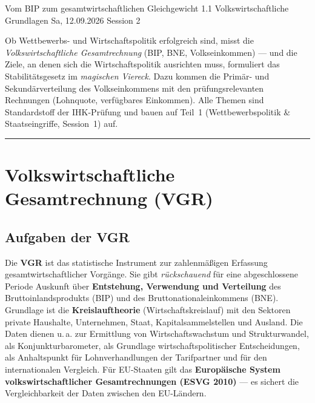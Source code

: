 \documentclass[11pt, a4paper]{article}
\begin{document}
%
  {Vom BIP zum gesamtwirtschaftlichen Gleichgewicht}%
  {1.1 Volkswirtschaftliche Grundlagen}%
  {Sa, 12.09.2026 \textperiodcentered{} Session 2}

\begin{merksatz}[title={\bfseries Worum geht es in Teil 2?}]
Ob Wettbewerbs- und Wirtschaftspolitik erfolgreich sind, misst die
\emph{Volkswirtschaftliche Gesamtrechnung} (BIP, BNE, Volkseinkommen) --- und die Ziele,
an denen sich die Wirtschaftspolitik ausrichten muss, formuliert das Stabilitätsgesetz
im \emph{magischen Viereck}. Dazu kommen die Primär- und Sekundärverteilung des
Volkseinkommens mit den prüfungsrelevanten Rechnungen (Lohnquote, verfügbares
Einkommen). Alle Themen sind Standardstoff der IHK-Prüfung und bauen auf Teil~1
(Wettbewerbspolitik \& Staatseingriffe, Session~1) auf.
\end{merksatz}

\tableofcontents
\vspace{1em}
\hrule
\vspace{1em}

\section{Volkswirtschaftliche Gesamtrechnung (VGR)}

\subsection{Aufgaben der VGR}

Die \textbf{VGR} ist das statistische Instrument zur zahlenmäßigen Erfassung
gesamtwirtschaftlicher Vorgänge. Sie gibt \emph{rückschauend} für eine abgeschlossene
Periode Auskunft über \textbf{Entstehung, Verwendung und Verteilung} des
Bruttoinlandsprodukts (BIP) und des Bruttonationaleinkommens (BNE). Grundlage ist die
\textbf{Kreislauftheorie} (Wirtschaftskreislauf) mit den Sektoren private Haushalte,
Unternehmen, Staat, Kapitalsammelstellen und Ausland. Die Daten dienen u.\,a. zur
Ermittlung von Wirtschaftswachstum und Strukturwandel, als Konjunkturbarometer, als
Grundlage wirtschaftspolitischer Entscheidungen, als Anhaltspunkt für Lohnverhandlungen
der Tarifpartner und für den internationalen Vergleich. Für EU-Staaten gilt das
\textbf{Europäische System volkswirtschaftlicher Gesamtrechnungen (ESVG 2010)} --- es
sichert die Vergleichbarkeit der Daten zwischen den EU-Ländern.
\end{document}
